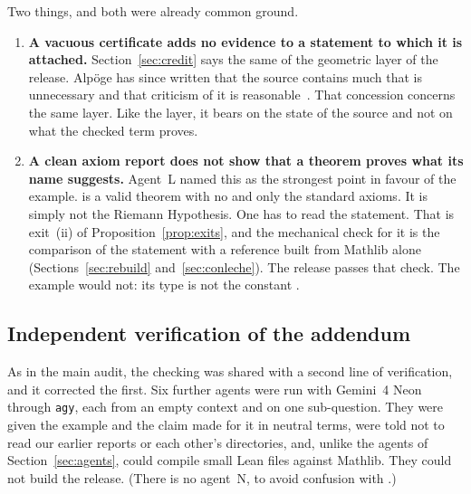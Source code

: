 Two things, and both were already common ground.

\begin{enumerate}
\item \textbf{A vacuous certificate adds no evidence to a statement to which it is attached.} Section~\ref{sec:credit} says the same of the geometric layer of the release.
Alpöge has since written that the source contains much that is unnecessary and that criticism of it is reasonable~\cite{alpogepost}. That concession concerns the same layer. Like the layer, it bears on the state of the source and not on what the checked term proves.
\item \textbf{A clean axiom report does not show that a theorem proves what its name suggests.} Agent~L named this as the strongest point in favour of the example.
 is a valid theorem with no  and only the standard axioms. It is simply not the Riemann Hypothesis. One has to read the statement.
That is exit~(ii) of Proposition~\ref{prop:exits}, and the mechanical check for it is the comparison of the statement with a reference built from Mathlib alone (Sections~\ref{sec:rebuild} and~\ref{sec:conleche}).
The release passes that check. The example would not: its type is not the constant .
\end{enumerate}

\subsection{Independent verification of the addendum}
\label{sec:agents3}

As in the main audit, the checking was shared with a second line of verification, and it corrected the first.
Six further agents were run with Gemini~4 Neon through \texttt{agy}, each from an empty context and on one sub-question. They were given the example and the claim made for it in neutral terms, were told not to read our earlier reports or each other's directories,
and, unlike the agents of Section~\ref{sec:agents}, could compile small Lean files against Mathlib. They could not build the release. (There is no agent~N, to avoid confusion with \N.)

